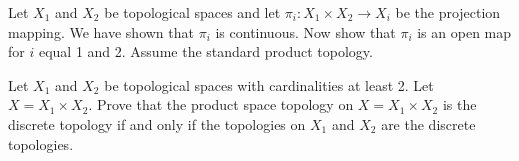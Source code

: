 \begin{comment}

\ExerciseSolution Suppose $X$ is compact. Let $\{U_{\alpha}\}$ and $\{V_{\beta}\}$ be open covers of $X_1$ and $X_2$, respectively. If $(x_1,x_2) \in X_1 \times X_2$, then $x_1 \in X_1$ and $x_2 \in X_2$. So there exist $U_{\alpha}$ and $V_{\beta}$ such that $x_1 \in U_{\alpha}$ and $x_2 in V_{\beta}$. It follows that the collection $\{U_{\alpha} \times V_{\beta}\}$ is an open cover of $X$. Since $X$ is compact, there is a finite subcover $\{U_{\alpha_i} \times V_{\beta_j}\}$ for $1 \leq i \leq m$ and $1 \leq j \leq n$ for some positive integers $m$ and $n$. But then $\{U_{\alpha_i}\}_{1 \leq i \leq m}$ is a cover of $X_1$ and $\{V_{\beta_j}\}_{1 \leq j \leq n}$ is a cover of $X_2$. Therefore, $X_1$ and $X_2$ are compact. 

\end{comment}

\item \label{ex_projection_open} Let $X_1$ and $X_2$ be topological spaces and let $\pi_i : X_1 \times X_2 \to X_i$ be the projection mapping. We have shown that $\pi_i$ is continuous. Now show that $\pi_i$ is an open map for $i$ equal 1 and 2. Assume the standard product topology.

\begin{comment}

\ExerciseSolution Let $U$ be an open set in $X = X_1 \times X_2$. Then $U$ is a union of sets of the form $U_{\alpha} \times V_{\beta}$, where $U_{\alpha}$ is open in $X_1$ and $V_{\beta}$ is open in $X_2$. Exercise \ref{ex:unions_cross_products}  shows that 
\[\bigcup (U_{\alpha} \times V_{\beta}) = \left(\bigcup U_{\alpha}\right) \times \left(\bigcup V_{\beta} \right),\]
so $\pi_1(U) = \bigcup U_{\alpha}$ and $\pi_2(U) = \bigcup V_{\beta}$. In each case, $\pi_i$ maps $U$ to an open set. We conclude that $\pi_i$ is an open map for each $i$. 
 

\end{comment}

\item Let $X_1$ and $X_2$ be topological spaces with cardinalities at least 2. Let $X = X_1 \times X_2$. Prove that the product space topology on $X = X_1 \times X_2$ is the discrete topology if and only if the topologies on $X_1$ and $X_2$ are the discrete topologies. 

\begin{comment}

\ExerciseSolution First assume that the topologies on $X_1$ and $X_2$ are discrete. Let $(x_1, x_2)$ be in $X$. Since $\{x_1\}$ is open in $X_1$ and $\{x_2\}$ is open in $X_2$, the set $\{x_1\} \times \{x_2\} = \{(x_1,x_2)\}$ is open in $X$. When every single point set is open, the topology is the discrete topology.

Conversely, suppose that the topology on $X$ is the discrete topology. Let $x_1 \in X_1$ and $x_2 \in X_2$. The set $\{(x_1,x_2)\}$ is open in $X$. By Exercise \ref{ex_projection_open} we know that $\pi_i(\{(x_1,x_2\}) = \{x_i\}$ is open in $X_i$. Thus, the topology on $X_i$ is discrete for $i$ equal $1$ or $2$. 

\end{comment}


